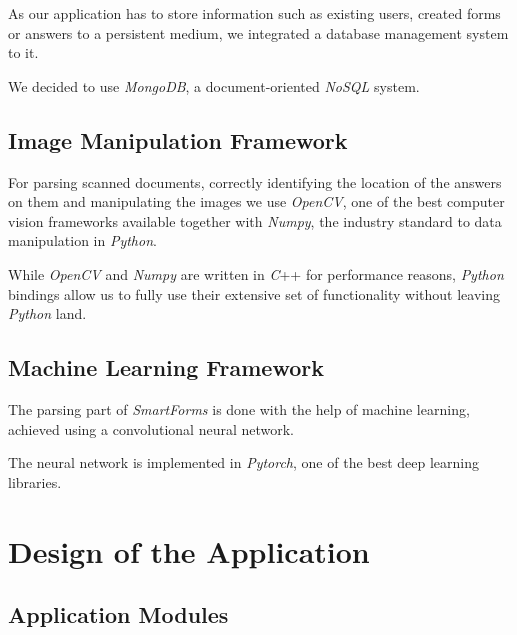 \documentclass[11pt, a4paper]{report}
\begin{document}
As our application has to store information such as existing users, created forms or answers to a persistent medium, we integrated a database management system to it.

We decided to use \textit{MongoDB}, a document-oriented \textit{NoSQL} system.

\section{Image Manipulation Framework}

For parsing scanned documents, correctly identifying the location of the answers on them and manipulating the images we use \textit{OpenCV}, one of the best computer vision frameworks available together with \textit{Numpy}, the industry standard to data manipulation in \textit{Python}.

While \textit{OpenCV} and \textit{Numpy} are written in \textit{C}++ for performance reasons, \textit{Python} bindings allow us to fully use their extensive set of functionality without leaving \textit{Python} land.

\section{Machine Learning Framework}

The parsing part of \textit{SmartForms} is done with the help of machine learning, achieved using a convolutional neural network.

The neural network is implemented in \textit{Pytorch}, one of the best deep learning libraries.




\chapter{Design of the Application}


\section{Application Modules}
\end{document}
